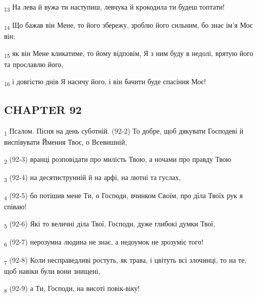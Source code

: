 \begin{tcolorbox}
\textsubscript{13} На лева й вужа ти наступиш, левчука й крокодила ти будеш топтати!
\end{tcolorbox}
\begin{tcolorbox}
\textsubscript{14} Що бажав він Мене, то його збережу, зроблю його сильним, бо знає ім'я Моє він;
\end{tcolorbox}
\begin{tcolorbox}
\textsubscript{15} як він Мене кликатиме, то йому відповім, Я з ним буду в недолі, врятую його та прославлю його,
\end{tcolorbox}
\begin{tcolorbox}
\textsubscript{16} і довгістю днів Я насичу його, і він бачити буде спасіння Моє!
\end{tcolorbox}
\subsection{CHAPTER 92}
\begin{tcolorbox}
\textsubscript{1} Псалом. Пісня на день суботній. (92-2) То добре, щоб дякувати Господеві й виспівувати Ймення Твоє, о Всевишній,
\end{tcolorbox}
\begin{tcolorbox}
\textsubscript{2} (92-3) вранці розповідати про милість Твою, а ночами про правду Твою
\end{tcolorbox}
\begin{tcolorbox}
\textsubscript{3} (92-4) на десятиструнній й на арфі, на лютні та гуслах,
\end{tcolorbox}
\begin{tcolorbox}
\textsubscript{4} (92-5) бо потішив мене Ти, о Господи, вчинком Своїм, про діла Твоїх рук я співаю!
\end{tcolorbox}
\begin{tcolorbox}
\textsubscript{5} (92-6) Які то величні діла Твої, Господи, дуже глибокі думки Твої,
\end{tcolorbox}
\begin{tcolorbox}
\textsubscript{6} (92-7) нерозумна людина не знає, а недоумок не зрозуміє того!
\end{tcolorbox}
\begin{tcolorbox}
\textsubscript{7} (92-8) Коли несправедливі ростуть, як трава, і цвітуть всі злочинці, то на те, щоб навіки були вони знищені,
\end{tcolorbox}
\begin{tcolorbox}
\textsubscript{8} (92-9) а Ти, Господи, на висоті повік-віку!
\end{tcolorbox}
